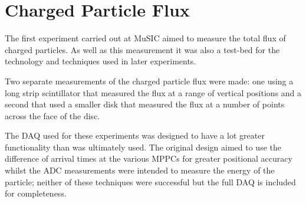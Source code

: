 

\clearpage
\section{Charged Particle Flux} %
\label{cha:charged_particle_flux}
The first experiment carried out at MuSIC aimed to measure the total flux of charged particles. As well as this measurement it was also a test-bed for the technology and techniques used in later experiments.

Two separate measurements of the charged particle flux were made: one using a long strip scintillator that measured the flux at a range of vertical positions and a second that used a smaller disk that measured the flux at a number of points across the face of the disc.

The DAQ used for these experiments was designed to have a lot greater functionality than was ultimately used. The original design aimed to use the difference of arrival times at the various MPPCs for greater positional accuracy whilst the ADC measurements were intended to measure the energy of the particle; neither of these techniques were successful but the full DAQ is included for completeness.

